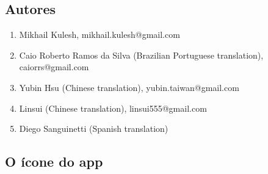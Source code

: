 \documentclass[DIV=calc, paper=a4, fontsize=11pt, twocolumn]{scrartcl}
\begin{document}
\subsection{Autores}

\begin{enumerate}
\item Mikhail Kulesh,
mikhail.kulesh@gmail.com

\item Caio Roberto Ramos da Silva
(Brazilian Portuguese translation),
caiorrs@gmail.com

\item Yubin Hsu
(Chinese translation),
yubin.taiwan@gmail.com

\item Linsui
(Chinese translation),
linsui555@gmail.com

\item Diego Sanguinetti
(Spanish translation)
\end{enumerate}

\subsection{O ícone do app}
\end{document}
